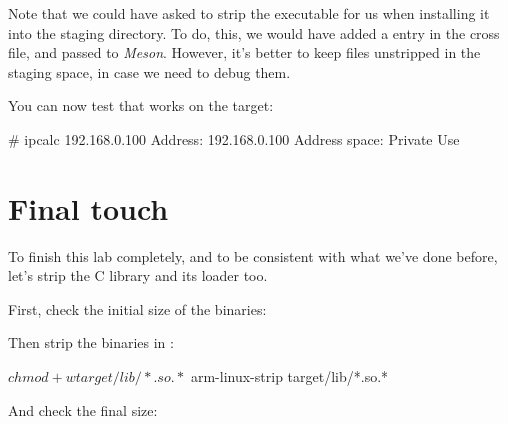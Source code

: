 Note that we could have asked  to strip the
executable for us when installing it into the staging directory.
To do, this, we would have added a  entry in the cross file,
and passed  to {\em Meson}. However, it's better to keep
files unstripped in the staging space, in case we need to debug them.

You can now test that  works on the target:

\begin{bashinput}
# ipcalc 192.168.0.100
Address:	192.168.0.100
Address space:	Private Use
\end{bashinput}

\section{Final touch}

To finish this lab completely, and to be consistent with what we've done before,
let's strip the C library and its loader too.

First, check the initial size of the binaries:

Then strip the binaries in :
\begin{bashinput}
$ chmod +w target/lib/*.so.*
$ arm-linux-strip target/lib/*.so.*
\end{bashinput}

And check the final size:
